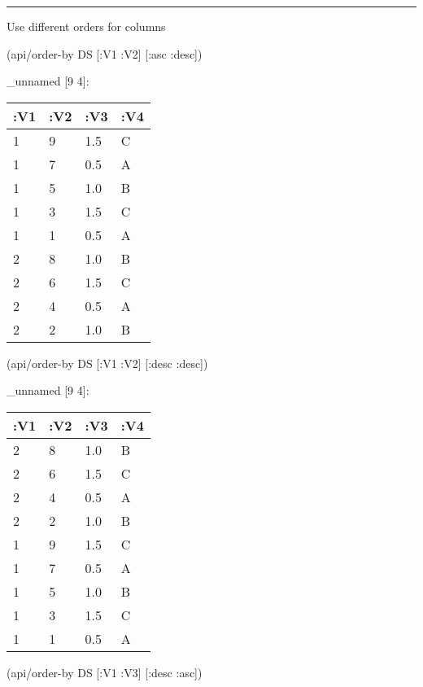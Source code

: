 \documentclass[]{article}
\newenvironment{Shaded}{\begin{snugshade}}{\end{snugshade}}
\newcommand{\AttributeTok}[1]{\textcolor[rgb]{0.77,0.63,0.00}{#1}}
\newcommand{\NormalTok}[1]{#1}
\begin{document}
\begin{center}\rule{0.5\linewidth}{0.5pt}\end{center}

Use different orders for columns

\begin{Shaded}
\begin{Highlighting}[]
\NormalTok{(api/order-by DS [}\AttributeTok{:V1} \AttributeTok{:V2}\NormalTok{] [}\AttributeTok{:asc} \AttributeTok{:desc}\NormalTok{])}
\end{Highlighting}
\end{Shaded}

\_unnamed {[}9 4{]}:

\begin{longtable}[]{@{}llll@{}}
\toprule
:V1 & :V2 & :V3 & :V4\tabularnewline
\midrule
\endhead
1 & 9 & 1.5 & C\tabularnewline
1 & 7 & 0.5 & A\tabularnewline
1 & 5 & 1.0 & B\tabularnewline
1 & 3 & 1.5 & C\tabularnewline
1 & 1 & 0.5 & A\tabularnewline
2 & 8 & 1.0 & B\tabularnewline
2 & 6 & 1.5 & C\tabularnewline
2 & 4 & 0.5 & A\tabularnewline
2 & 2 & 1.0 & B\tabularnewline
\bottomrule
\end{longtable}

\begin{Shaded}
\begin{Highlighting}[]
\NormalTok{(api/order-by DS [}\AttributeTok{:V1} \AttributeTok{:V2}\NormalTok{] [}\AttributeTok{:desc} \AttributeTok{:desc}\NormalTok{])}
\end{Highlighting}
\end{Shaded}

\_unnamed {[}9 4{]}:

\begin{longtable}[]{@{}llll@{}}
\toprule
:V1 & :V2 & :V3 & :V4\tabularnewline
\midrule
\endhead
2 & 8 & 1.0 & B\tabularnewline
2 & 6 & 1.5 & C\tabularnewline
2 & 4 & 0.5 & A\tabularnewline
2 & 2 & 1.0 & B\tabularnewline
1 & 9 & 1.5 & C\tabularnewline
1 & 7 & 0.5 & A\tabularnewline
1 & 5 & 1.0 & B\tabularnewline
1 & 3 & 1.5 & C\tabularnewline
1 & 1 & 0.5 & A\tabularnewline
\bottomrule
\end{longtable}

\begin{Shaded}
\begin{Highlighting}[]
\NormalTok{(api/order-by DS [}\AttributeTok{:V1} \AttributeTok{:V3}\NormalTok{] [}\AttributeTok{:desc} \AttributeTok{:asc}\NormalTok{])}
\end{Highlighting}
\end{Shaded}
\end{document}
